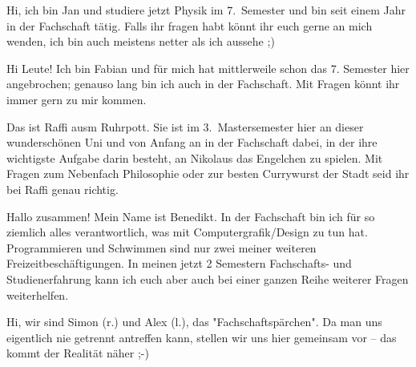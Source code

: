 \begin{multicols*}{2}
{Hi, ich bin Jan und studiere jetzt Physik im 7.\ Semester und bin seit einem Jahr in der Fachschaft tätig. Falls ihr fragen habt könnt ihr euch gerne an mich wenden, ich bin auch meistens netter als ich aussehe ;)}

{Hi Leute! Ich bin Fabian und für mich hat mittlerweile schon das 7. Semester hier angebrochen; genauso lang bin ich auch in der Fachschaft. Mit Fragen könnt ihr immer gern zu mir kommen.}
\vspace{2\baselineskip}

{Das ist Raffi ausm Ruhrpott. Sie ist im 3.\ Mastersemester hier an dieser wunderschönen Uni und von Anfang an in der Fachschaft dabei, in der ihre wichtigste Aufgabe darin besteht, an Nikolaus das Engelchen zu spielen. Mit Fragen zum Nebenfach Philosophie oder zur besten Currywurst der Stadt seid ihr bei Raffi genau richtig.}

{Hallo zusammen! Mein Name ist Benedikt. In der Fachschaft bin ich für so ziemlich alles verantwortlich, was mit Computergrafik/Design zu tun hat. Programmieren und Schwimmen sind nur zwei meiner weiteren Freizeitbeschäftigungen. In meinen jetzt 2 Semestern Fachschafts- und Studienerfahrung kann ich euch aber auch bei einer ganzen Reihe weiterer Fragen weiterhelfen. }

{%
Hi, wir sind Simon (r.) und Alex (l.), das "Fachschaftspärchen". Da man uns eigentlich nie getrennt antreffen kann, stellen wir uns hier gemeinsam vor -- das kommt der Realität näher ;-)

}
\end{multicols*}
